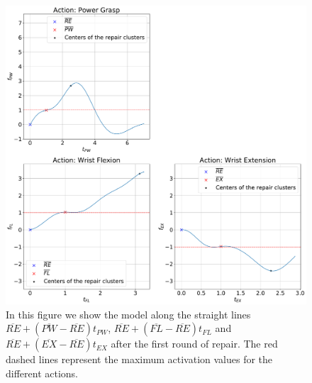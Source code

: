 \begin{figure}[H]
    \centering
    \includegraphics[width=\textwidth]{Images/repair-example/SMT-State1.pdf}
    \caption{In this figure we show the model along the straight lines $\overline{RE} + (\overline{PW} - \overline{RE})t_{PW}$, $\overline{RE} + (\overline{FL} - \overline{RE})t_{FL}$ and $\overline{RE} + (\overline{EX} - \overline{RE})t_{EX}$ after the first round of repair. The red dashed lines represent the maximum activation values for the different actions.}
    \label{fig:SMT-exec-1}
\end{figure}
